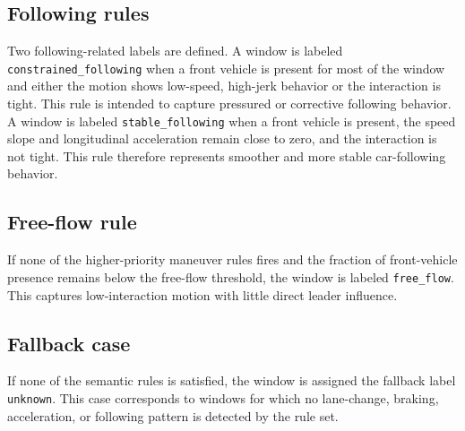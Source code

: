 \subsection*{Following rules}

Two following-related labels are defined. 
A window is labeled \texttt{constrained\_following} when a front vehicle is present for most of the window and either the motion shows low-speed, high-jerk behavior or the interaction is tight. 
This rule is intended to capture pressured or corrective following behavior. 
A window is labeled \texttt{stable\_following} when a front vehicle is present, the speed slope and longitudinal acceleration remain close to zero, and the interaction is not tight. 
This rule therefore represents smoother and more stable car-following behavior.

\subsection*{Free-flow rule}

If none of the higher-priority maneuver rules fires and the fraction of front-vehicle presence remains below the free-flow threshold, the window is labeled \texttt{free\_flow}. 
This captures low-interaction motion with little direct leader influence.

\subsection*{Fallback case}

If none of the semantic rules is satisfied, the window is assigned the fallback label \texttt{unknown}. 
This case corresponds to windows for which no lane-change, braking, acceleration, or following pattern is detected by the rule set.